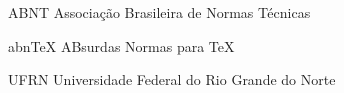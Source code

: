 \begin{siglas}
  \item[ABNT] Associação Brasileira de Normas Técnicas
  \item[abnTeX] ABsurdas Normas para TeX
  \item[UFRN] Universidade Federal do Rio Grande do Norte
\end{siglas}
